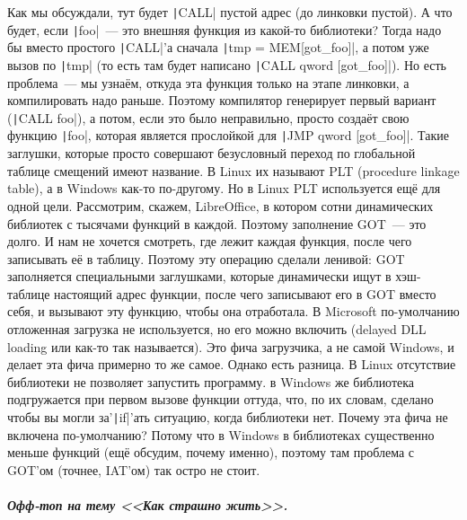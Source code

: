 \documentclass{article}
\begin{document}
    Как мы обсуждали, тут будет \texttt|CALL| пустой адрес (до линковки пустой). А что будет, если \texttt|foo|~--- это внешняя функция из какой-то библиотеки? Тогда надо бы вместо простого \texttt|CALL|'а сначала \texttt|tmp = MEM[got_foo]|, а потом уже вызов по \texttt|tmp| (то есть там будет написано \texttt|CALL qword [got_foo]|). Но есть проблема~--- мы узнаём, откуда эта функция только на этапе линковки, а компилировать надо раньше. Поэтому компилятор генерирует первый вариант (\texttt|CALL foo|), а потом, если это было неправильно, просто создаёт свою функцию \texttt|foo|, которая является прослойкой для \texttt|JMP qword [got_foo]|. Такие заглушки, которые просто совершают безусловный переход по глобальной таблице смещений имеют название. В Linux их называют PLT (procedure linkage table), а в Windows как-то по-другому. Но в Linux PLT используется ещё для одной цели. Рассмотрим, скажем, LibreOffice, в котором сотни динамических библиотек с тысячами функций в каждой. Поэтому заполнение GOT~--- это долго. И нам не хочется смотреть, где лежит каждая функция, после чего записывать её в таблицу. Поэтому эту операцию сделали ленивой: GOT заполняется специальными заглушками, которые динамически ищут в хэш-таблице настоящий адрес функции, после чего записывают его в GOT вместо себя, и вызывают эту функцию, чтобы она отработала. В Microsoft по-умолчанию отложенная загрузка не используется, но его можно включить (delayed DLL loading или как-то так называется). Это фича загрузчика, а не самой Windows, и делает эта фича примерно то же самое. Однако есть разница. В Linux отсутствие библиотеки не позволяет запустить программу. в Windows же библиотека подгружается при первом вызове функции оттуда, что, по их словам, сделано чтобы вы могли за'\texttt|if|'ать ситуацию, когда библиотеки нет. Почему эта фича не включена по-умолчанию? Потому что в Windows в библиотеках существенно меньше функций (ещё обсудим, почему именно), поэтому там проблема с GOT'ом (точнее, IAT'ом) так остро не стоит.
    \subparagraph{Офф-топ на тему <<Как страшно жить>>.}
\end{document}
